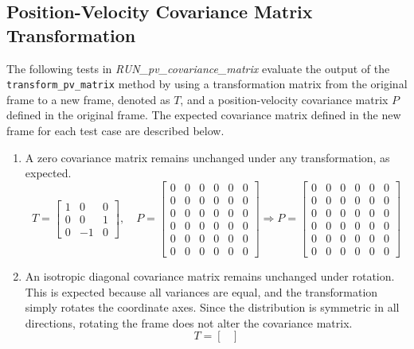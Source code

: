 \documentclass[11pt,fleqn]{report}
\begin{document}
\subsection{Position-Velocity Covariance Matrix Transformation}
The following tests in \textit{RUN\_pv\_covariance\_matrix} evaluate the output of the 
\texttt{transform\_pv\_matrix} method by using a transformation matrix from 
the original frame to a new frame, denoted as $T$, and a position-velocity 
covariance matrix $P$ defined in the original frame. The expected covariance 
matrix defined in the new frame for each test case are described below.

\begin{enumerate}
\item{
A zero covariance matrix remains unchanged under any transformation,
as expected.
\begin{equation*}
T = 
\begin{bmatrix}
1 & 0 & 0 \\
0 & 0 & 1 \\
0 & -1 & 0
\end{bmatrix}, \quad
P = 
\begin{bmatrix}
0 & 0 & 0 & 0 & 0 & 0 \\
0 & 0 & 0 & 0 & 0 & 0 \\
0 & 0 & 0 & 0 & 0 & 0 \\
0 & 0 & 0 & 0 & 0 & 0 \\
0 & 0 & 0 & 0 & 0 & 0 \\
0 & 0 & 0 & 0 & 0 & 0
\end{bmatrix} \Longrightarrow
P = 
\begin{bmatrix}
0 & 0 & 0 & 0 & 0 & 0 \\
0 & 0 & 0 & 0 & 0 & 0 \\
0 & 0 & 0 & 0 & 0 & 0 \\
0 & 0 & 0 & 0 & 0 & 0 \\
0 & 0 & 0 & 0 & 0 & 0 \\
0 & 0 & 0 & 0 & 0 & 0
\end{bmatrix}
\end{equation*}}
\item{
An isotropic diagonal covariance matrix remains unchanged under rotation. 
This is expected because all variances are equal, and the transformation 
simply rotates the coordinate axes. Since the distribution is symmetric in 
all directions, rotating the frame does not alter the covariance matrix.
\begin{equation*}
T = 
\begin{bmatrix}

\end{bmatrix}
\end{equation*}}
\end{enumerate}
\end{document}
